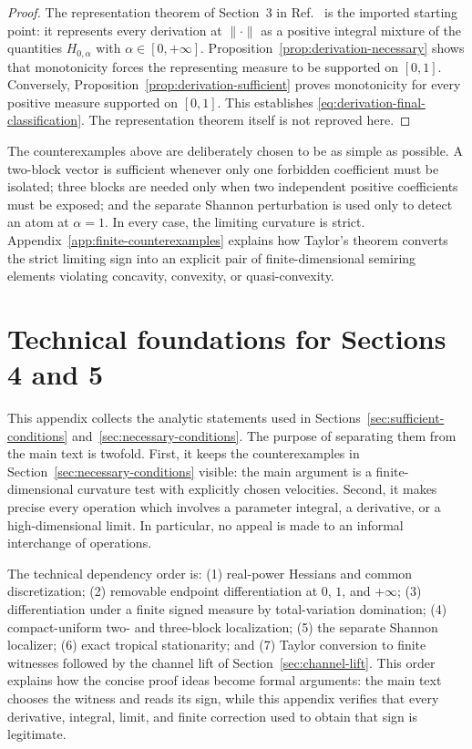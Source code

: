 \documentclass[aps,pra,11pt,onecolumn,nofootinbib,tightenlines]{revtex4-2}
\theoremstyle{definition}
\begin{document}
\begin{proof}
The representation theorem of Section~3 in Ref.~\cite{rubboli2026complete} is the imported starting point: it represents every derivation at $\|\cdot\|$ as a positive integral mixture of the quantities $H_{0,\alpha}$ with $\alpha\in[0,+\infty]$. Proposition~\ref{prop:derivation-necessary} shows that monotonicity forces the representing measure to be supported on $[0,1]$. Conversely, Proposition~\ref{prop:derivation-sufficient} proves monotonicity for every positive measure supported on $[0,1]$. This establishes \eqref{eq:derivation-final-classification}. The representation theorem itself is not reproved here.
\end{proof}

The counterexamples above are deliberately chosen to be as simple as possible. A two-block vector is sufficient whenever only one forbidden coefficient must be isolated; three blocks are needed only when two independent positive coefficients must be exposed; and the separate Shannon perturbation is used only to detect an atom at $\alpha=1$. In every case, the limiting curvature is strict. Appendix~\ref{app:finite-counterexamples} explains how Taylor's theorem converts the strict limiting sign into an explicit pair of finite-dimensional semiring elements violating concavity, convexity, or quasi-convexity.

\clearpage
\appendix
\section{Technical foundations for Sections 4 and 5}
\label{app:technical-sections45}

This appendix collects the analytic statements used in Sections~\ref{sec:sufficient-conditions} and~\ref{sec:necessary-conditions}.  The purpose of separating them from the main text is twofold.  First, it keeps the counterexamples in Section~\ref{sec:necessary-conditions} visible: the main argument is a finite-dimensional curvature test with explicitly chosen velocities.  Second, it makes precise every operation which involves a parameter integral, a derivative, or a high-dimensional limit.  In particular, no appeal is made to an informal interchange of operations.

The technical dependency order is: (1) real-power Hessians and common
discretization; (2) removable endpoint differentiation at $0$, $1$, and
$+\infty$; (3) differentiation under a finite signed measure by total-variation
domination; (4) compact-uniform two- and three-block localization; (5) the
separate Shannon localizer; (6) exact tropical stationarity; and (7) Taylor
conversion to finite witnesses followed by the channel lift of
Section~\ref{sec:channel-lift}.  This order explains how the concise proof ideas
become formal arguments: the main text chooses the witness and reads its sign,
while this appendix verifies that every derivative, integral, limit, and finite
correction used to obtain that sign is legitimate.
\end{document}
